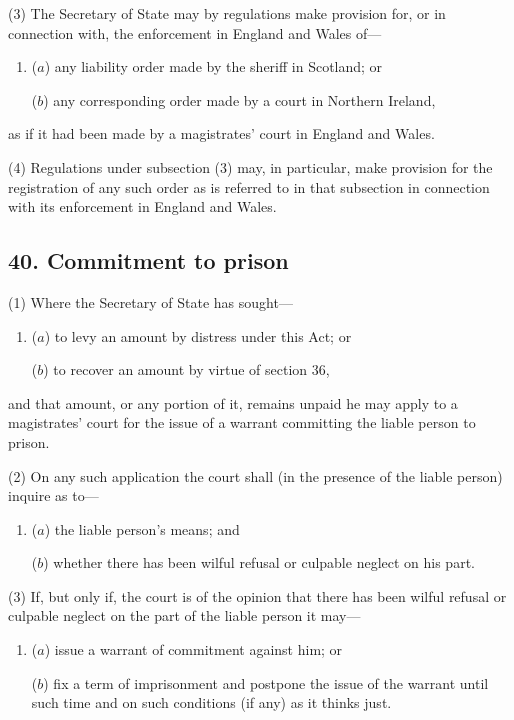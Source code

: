 \documentclass[12pt,a4paper]{article}
\begin{document}
(3) The Secretary of State may by regulations make provision for, or in connection with, the enforcement in England and Wales of—
\begin{enumerate}\item[]
($a$) any liability order made by the sheriff in Scotland; or

($b$) any corresponding order made by a court in Northern Ireland,
\end{enumerate}
as if it had been made by a magistrates' court in England and Wales.

(4) Regulations under subsection (3)  may, in particular, make provision for the registration of any such order as is referred to in that subsection in connection with its enforcement in England and Wales.


\subsection{40. Commitment to prison}

(1) Where the Secretary of State has sought—
\begin{enumerate}\item[]
($a$) to levy an amount by distress under this Act; or

($b$) to recover an amount by virtue of section 36,
\end{enumerate}
and that amount, or any portion of it, remains unpaid he may apply to a magistrates' court for the issue of a warrant committing the liable person to prison.

(2) On any such application the court shall (in the presence of the liable person) inquire as to—
\begin{enumerate}\item[]
($a$) the liable person’s means; and

($b$) whether there has been wilful refusal or culpable neglect on his part.
\end{enumerate}

(3) If, but only if, the court is of the opinion that there has been wilful refusal or culpable neglect on the part of the liable person it may—
\begin{enumerate}\item[]
($a$) issue a warrant of commitment against him; or

($b$) fix a term of imprisonment and postpone the issue of the warrant until such time and on such conditions (if any) as it thinks just.
\end{enumerate}
\end{document}
